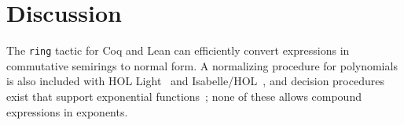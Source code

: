 \documentclass{llncs}
\newcommand{\lean}[1]{\texttt{#1}\xspace} %
\newcommand{\mathlib}{\texttt{mathlib}\xspace}
\newcommand{\ring}{\lean{ring}}
\newcommand{\ringexp}{\lean{ring\_exp}}
\begin{document}
% 

%
%


\section{Discussion}

The \ring tactic for Coq and Lean can efficiently convert expressions in commutative semirings to normal form.
A normalizing procedure for polynomials is also included with HOL Light~\cite{hol_light} and Isabelle/HOL~\cite{isabelle_hol},
and decision procedures exist that support exponential functions~\cite{resolution-rcf};
none of these allows compound expressions in exponents.
\end{document}
